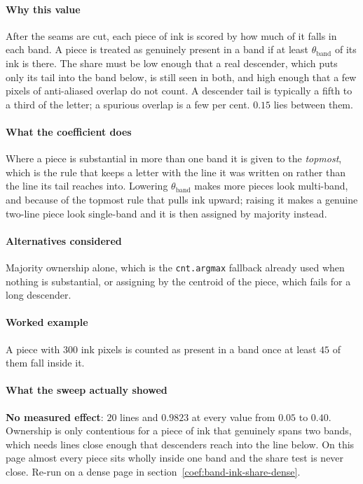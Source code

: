 \paragraph{Why this value}

After the seams are cut, each piece of ink is scored by how much of it falls in each band. A piece is treated as genuinely present in a band if at least $\theta_{\text{band}}$ of its ink is there. The share must be low enough that a real descender, which puts only its tail into the band below, is still seen in both, and high enough that a few pixels of anti-aliased overlap do not count. A descender tail is typically a fifth to a third of the letter; a spurious overlap is a few per cent. $0.15$ lies between them.

\paragraph{What the coefficient does}

Where a piece is substantial in more than one band it is given to the \emph{topmost}, which is the rule that keeps a letter with the line it was written on rather than the line its tail reaches into. Lowering $\theta_{\text{band}}$ makes more pieces look multi-band, and because of the topmost rule that pulls ink upward; raising it makes a genuine two-line piece look single-band and it is then assigned by majority instead.

\paragraph{Alternatives considered}

Majority ownership alone, which is the \texttt{cnt.argmax} fallback already used when nothing is substantial, or assigning by the centroid of the piece, which fails for a long descender.

\paragraph{Worked example}

A piece with $300$ ink pixels is counted as present in a band once at least $45$ of them fall inside it.

\paragraph{What the sweep actually showed}

\textbf{No measured effect}: $20$ lines and $0.9823$ at every value from $0.05$ to $0.40$. Ownership is only contentious for a piece of ink that genuinely spans two bands, which needs lines close enough that descenders reach into the line below. On this page almost every piece sits wholly inside one band and the share test is never close. Re-run on a dense page in section~\ref{coef:band-ink-share-dense}.

